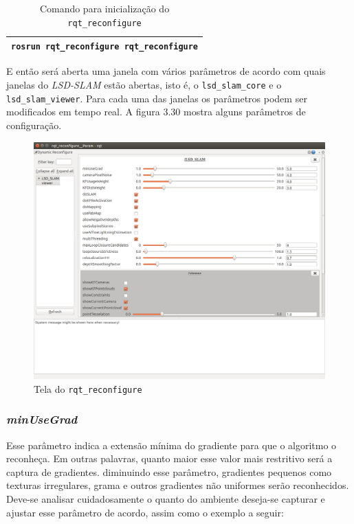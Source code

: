\begin{table}[!ht]\label{tb:16}
\begin{tabular}{| p{\textwidth}|}
\hline
\texttt{rosrun rqt\_reconfigure rqt\_reconfigure}\\
\hline
\end{tabular}
\caption{Comando para inicialização do \texttt{rqt\_reconfigure}}
\end{table}

E então será aberta uma janela com vários parâmetros de acordo com quais janelas do \textit{LSD-SLAM} estão abertas, isto é, o \texttt{lsd\_slam\_core} e o \texttt{lsd\_slam\_viewer}. Para cada uma das janelas os parâmetros podem ser modificados em tempo real. A figura 3.30 mostra alguns parâmetros de configuração.

\begin{figure}[!htb]
	\centering
		\includegraphics[width= \textwidth]{Imagens/figura3-30.png}
	\caption{Tela do \texttt{rqt\_reconfigure}}
	\label{fig3:28}
\end{figure}



\subsubsection{\textit{minUseGrad}}

Esse parâmetro indica a extensão mínima do gradiente para que o algoritmo o reconheça. Em outras palavras, quanto maior esse valor mais restritivo será a captura de gradientes. diminuindo esse parâmetro, gradientes pequenos como texturas irregulares, grama e outros gradientes não uniformes serão reconhecidos. Deve-se analisar cuidadosamente o quanto do ambiente deseja-se capturar e ajustar esse parâmetro de acordo, assim como o exemplo a seguir:

